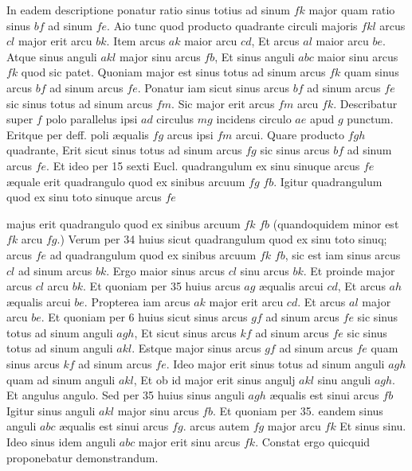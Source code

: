 \documentclass[11pt,a4paper]{article}
\begin{document}
In eadem descriptione ponatur ratio sinus totius ad sinum $fk$ major quam ratio sinus $bf$ ad sinum $fe$. Aio tunc quod producto quadrante circuli majoris $fkl$ arcus $cl$ major erit arcu $bk$. Item arcus $ak$ maior arcu $cd$, Et arcus $al$ maior arcu $be$. Atque sinus anguli $akl$ major sinu arcus $fb$, Et sinus anguli $abc$ maior sinu arcus $fk$ quod sic patet. Quoniam major est sinus totus ad sinum arcus $fk$ quam sinus arcus $bf$ ad sinum arcus $fe$. Ponatur iam sicut sinus arcus $bf$ ad sinum arcus $fe$ sic sinus totus ad sinum arcus $fm$. Sic major erit arcus $fm$ arcu $fk$. Describatur super $f$ polo parallelus ipsi $ad$ circulus $mg$ incidens circulo $ae$ apud $g$ punctum. Eritque per deff. poli æqualis $fg$ arcus ipsi $fm$ arcui. Quare producto $fgh$ quadrante, Erit sicut sinus totus ad sinum arcus $fg$ sic sinus arcus $bf$ ad sinum arcus $fe$. Et ideo per 15 sexti Eucl. quadrangulum ex sinu sinuque arcus $fe$ æquale erit quadrangulo quod ex sinibus arcuum $fg$ $fb$. Igitur quadrangulum quod ex sinu toto sinuque arcus $fe$

majus erit quadrangulo quod ex sinibus arcuum $fk$ $fb$ (quandoquidem minor est $fk$ arcu $fg$.) Verum per 34 huius sicut quadrangulum quod ex sinu toto sinuq; arcus $fe$ ad quadrangulum quod ex sinibus arcuum $fk$ $fb$,  sic est iam sinus arcus $cl$ ad sinum arcus $bk$. Ergo maior sinus arcus $cl$ sinu arcus $bk$. Et proinde major arcus $cl$ arcu $bk$. Et quoniam per 35 huius arcus $ag$ æqualis arcui $cd$, Et arcus $ah$ æqualis arcui $be$. Propterea iam arcus $ak$ major erit arcu $cd$. Et arcus $al$ major arcu $be$. Et quoniam per 6 huius sicut sinus arcus $gf$ ad sinum arcus $fe$ sic sinus totus ad sinum anguli $agh$, Et sicut sinus arcus $kf$ ad sinum arcus $fe$ sic sinus totus ad sinum anguli $akl$. Estque major sinus arcus $gf$ ad sinum arcus $fe$ quam sinus arcus $kf$ ad sinum arcus $fe$. Ideo major erit sinus totus ad sinum anguli $agh$ quam ad sinum anguli $akl$, Et ob id major erit sinus angulj $akl$ sinu anguli $agh$. Et angulus angulo. Sed per 35 huius sinus anguli $agh$ æqualis est sinui arcus $fb$ Igitur sinus anguli $akl$ major sinu arcus $fb$. Et quoniam per 35. eandem sinus anguli $abc$ æqualis est sinui arcus $fg$. arcus autem $fg$ major arcu $fk$ Et sinus sinu. Ideo sinus idem anguli $abc$ major erit sinu arcus $fk$. Constat ergo quicquid proponebatur demonstrandum.
\end{document}
